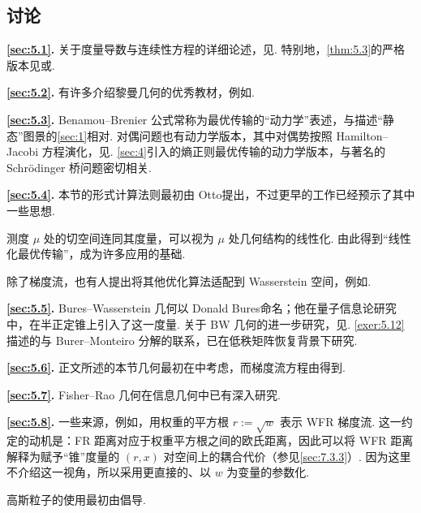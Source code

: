 \subsection{讨论}\label{sec:5.9}

\noindent\textbf{\autoref{sec:5.1}.} 关于度量导数与连续性方程的详细论述，见\cite{ref18,ref281,ref317}. 特别地，\autoref{thm:5.3}的严格版本见\cite[第 8 章]{ref18}或\cite[第 5 章]{ref281}.

\noindent\textbf{\autoref{sec:5.2}.} 有许多介绍黎曼几何的优秀教材，例如\cite{ref113}.

\noindent\textbf{\autoref{sec:5.3}.} Benamou--Brenier 公式常称为最优传输的“动力学”表述，与描述“静态”图景的\autoref{sec:1}相对. 对偶问题也有动力学版本，其中对偶势按照 Hamilton--Jacobi 方程演化，见\cite[第 8.1 节]{ref315}. \autoref{sec:4}引入的熵正则最优传输的动力学版本，与著名的 Schrödinger 桥问题密切相关\cite{ref70,ref206}.

\noindent\textbf{\autoref{sec:5.4}.} 本节的形式计算法则最初由 Otto\cite{ref249}提出，不过更早的工作\cite{ref191}已经预示了其中一些思想.

测度 $\mu$ 处的切空间连同其度量，可以视为 $\mu$ 处几何结构的线性化. 由此得到“线性化最优传输”，成为许多应用的基础\cite{ref33,ref35,ref63,ref180,ref181,ref255,ref284,ref322}.

除了梯度流，也有人提出将其他优化算法适配到 Wasserstein 空间，例如\cite{ref73,ref88,ref301,ref320,ref321}.

\noindent\textbf{\autoref{sec:5.5}.} Bures--Wasserstein 几何以 Donald Bures\cite{ref62}命名；他在量子信息论研究中，在半正定锥上引入了这一度量. 关于 BW 几何的进一步研究，见\cite{ref34,ref162,ref230,ref311}. \autoref{exer:5.12}描述的与 Burer--Monteiro 分解的联系，已在低秩矩阵恢复背景下研究\cite{ref218,ref224}.

\noindent\textbf{\autoref{sec:5.6}.} 正文所述的本节几何最初在\cite{ref69,ref107}中考虑，而梯度流方程由\cite{ref192}得到.

\noindent\textbf{\autoref{sec:5.7}.} Fisher--Rao 几何在信息几何中已有深入研究\cite{ref16,ref26}.

\noindent\textbf{\autoref{sec:5.8}.} 一些来源，例如\cite{ref209}，用权重的平方根 $r:=\sqrt w$ 表示 WFR 梯度流. 这一约定的动机是：FR 距离对应于权重平方根之间的欧氏距离，因此可以将 WFR 距离解释为赋予“锥”度量的 $(r,x)$ 对空间上的耦合代价（参见\autoref{sec:7.3.3}）. 因为这里不介绍这一视角，所以采用更直接的、以 $w$ 为变量的参数化.

高斯粒子的使用最初由\cite{ref192}倡导.
